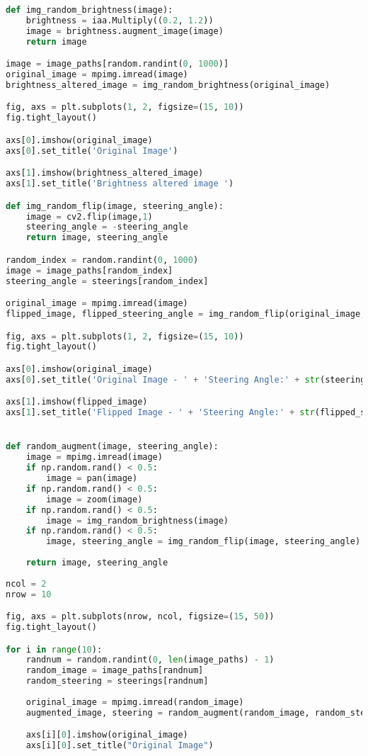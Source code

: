 \begin{lstlisting}[language=Python]
def img_random_brightness(image):
	brightness = iaa.Multiply((0.2, 1.2))
	image = brightness.augment_image(image)
	return image

image = image_paths[random.randint(0, 1000)]
original_image = mpimg.imread(image)
brightness_altered_image = img_random_brightness(original_image)

fig, axs = plt.subplots(1, 2, figsize=(15, 10))
fig.tight_layout()

axs[0].imshow(original_image)
axs[0].set_title('Original Image')

axs[1].imshow(brightness_altered_image)
axs[1].set_title('Brightness altered image ')

def img_random_flip(image, steering_angle):
	image = cv2.flip(image,1)
	steering_angle = -steering_angle
	return image, steering_angle

random_index = random.randint(0, 1000)
image = image_paths[random_index]
steering_angle = steerings[random_index]

original_image = mpimg.imread(image)
flipped_image, flipped_steering_angle = img_random_flip(original_image, steering_angle)

fig, axs = plt.subplots(1, 2, figsize=(15, 10))
fig.tight_layout()

axs[0].imshow(original_image)
axs[0].set_title('Original Image - ' + 'Steering Angle:' + str(steering_angle))

axs[1].imshow(flipped_image)
axs[1].set_title('Flipped Image - ' + 'Steering Angle:' + str(flipped_steering_angle))


def random_augment(image, steering_angle):
	image = mpimg.imread(image)
	if np.random.rand() < 0.5:
		image = pan(image)
	if np.random.rand() < 0.5:
		image = zoom(image)
	if np.random.rand() < 0.5:
		image = img_random_brightness(image)
	if np.random.rand() < 0.5:
		image, steering_angle = img_random_flip(image, steering_angle)
	
	return image, steering_angle
	
ncol = 2
nrow = 10

fig, axs = plt.subplots(nrow, ncol, figsize=(15, 50))
fig.tight_layout()

for i in range(10):
	randnum = random.randint(0, len(image_paths) - 1)
	random_image = image_paths[randnum]
	random_steering = steerings[randnum]
	
	original_image = mpimg.imread(random_image)
	augmented_image, steering = random_augment(random_image, random_steering)

	axs[i][0].imshow(original_image)
	axs[i][0].set_title("Original Image")


\end{lstlisting}
